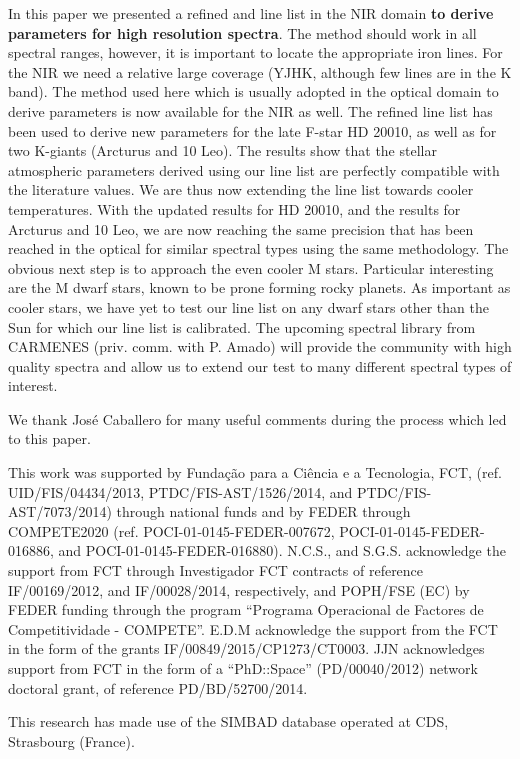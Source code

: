 \documentclass{aa}
\begin{document}
In this paper we presented a refined  and  line list in
the NIR domain {\bf to derive parameters for high resolution spectra}. The
method should work in all spectral ranges, however, it is important to locate
the appropriate iron lines. For the NIR we need a relative large coverage (YJHK,
although few lines are in the K band). The method used here which is usually
adopted in the optical domain to derive parameters is now available for the NIR
as well. The refined line list has been used to derive new parameters for the
late F-star HD 20010, as well as for two K-giants (Arcturus and 10 Leo). The
results show that the stellar atmospheric parameters derived using our line list
are perfectly compatible with the literature values. We are thus now extending
the line list towards cooler temperatures. With the updated results for HD
20010, and the results for Arcturus and 10 Leo, we are now reaching the same
precision that has been reached in the optical for similar spectral types using
the same methodology. The obvious next step is to approach the even cooler M
stars. Particular interesting are the M dwarf stars, known to be prone forming
rocky planets. As important as cooler stars, we have yet to test our line list
on any dwarf stars other than the Sun for which our line list is calibrated. The
upcoming spectral library from CARMENES (priv. comm. with P. Amado) will provide
the community with high quality spectra and allow us to extend our test to many
different spectral types of interest.



\begin{acknowledgements}

We thank Jos\'e Caballero for many useful comments during the process which
led to this paper.

This work was supported by Funda\c{c}\~ao para a Ci\^encia e a Tecnologia, FCT,
(ref. UID/FIS/04434/2013, PTDC/FIS-AST/1526/2014, and PTDC/FIS-AST/7073/2014)
through national funds and by FEDER through COMPETE2020 (ref.
POCI-01-0145-FEDER-007672, POCI-01-0145-FEDER-016886, and
POCI-01-0145-FEDER-016880). N.C.S., and S.G.S. acknowledge the support from FCT
through Investigador FCT contracts of reference IF/00169/2012, and
IF/00028/2014, respectively, and POPH/FSE (EC) by FEDER funding through the
program “Programa Operacional de Factores de Competitividade - COMPETE”. E.D.M
acknowledge the support from the FCT in the form of the grants
IF/00849/2015/CP1273/CT0003. JJN acknowledges support from FCT in the form of a
“PhD::Space” (PD/00040/2012) network doctoral grant, of reference
PD/BD/52700/2014.

This research has made use of the SIMBAD database operated at CDS, Strasbourg
(France).

\end{acknowledgements}
\end{document}
